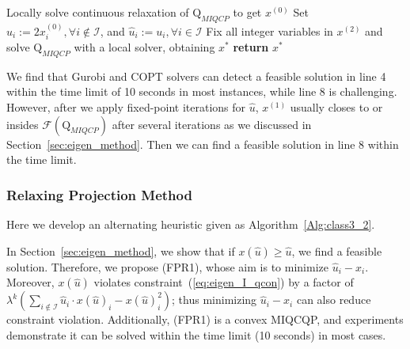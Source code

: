 \documentclass[]{article}
\begin{document}
\begin{algorithm}[!htbp]
\SetAlgoLined
\LinesNumbered
{}
 Locally solve continuous relaxation of $\mathrm{Q}_{MIQCP}$ to get $x^{(0)}$\;
 Set $\hat{u}_i:= 2x^{(0)}_i, \forall i\notin \mathcal{I}$, and $\hat{u}_i:= u_i, \forall i\in \mathcal{I}$\;
 Fix all integer variables in $x^{(2)}$ and solve $\mathrm{Q}_{MIQCP}$ with a local solver, obtaining $x^*$\;
 \textbf{return} $x^*$
 \caption{Two-Projection Method}
 \label{Alg:class3_1}
\end{algorithm}

We find that Gurobi \cite{gurobi} and COPT \cite{copt} solvers can detect a feasible solution in line 4 within the time limit of 10 seconds in most instances, while line 8 is challenging. However, after we apply fixed-point iterations \cite{ortega2000iterative,walker2011anderson} for $\hat{u}$, $x^{(1)}$ usually closes to or insides $\mathcal{F}(\mathrm{Q}_{MIQCP})$ after several iterations as we discussed in Section~\ref{sec:eigen_method}. Then we can find a feasible solution in line 8 within the time limit.

\subsubsection{Relaxing Projection Method}
\label{sec:relproj}
Here we develop an alternating heuristic given as Algorithm~\ref{Alg:class3_2}.

In Section~\ref{sec:eigen_method}, we show that if $x(\hat{u})\geq \hat{u}$, we find a feasible solution. Therefore, we propose (FPR1), whose aim is to minimize  $\hat{u}_i -x_i$. Moreover, $x(\hat{u})$ violates constraint~(\ref{eq:eigen_I_qcon}) by a factor of $\lambda^k(\sum_{i\not\in\mathcal{I}}\hat{u}_i\cdot x(\hat{u})_i - x(\hat{u})_i^2)$; thus minimizing $\hat{u}_i -x_i$ can also reduce constraint violation. Additionally, (FPR1) is a convex MIQCQP, and experiments demonstrate it can be solved within the time limit (10 seconds) in most cases.
\end{document}
